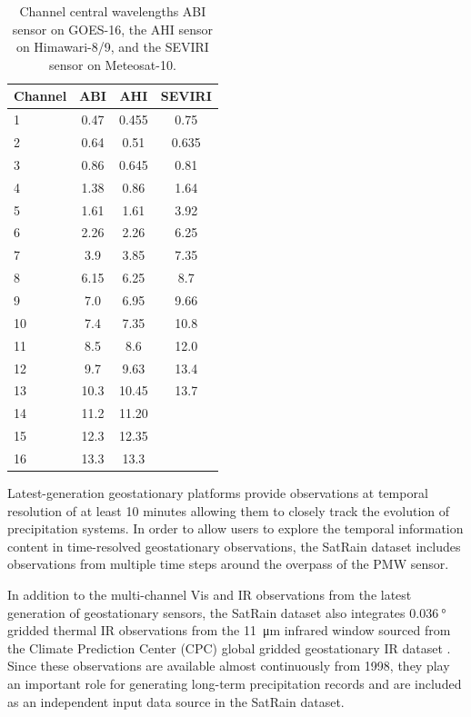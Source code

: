 \documentclass[11pt]{article}
\begin{document}
\begin{table}[htbp]
	\centering
	\begin{tabular}{lccc}
		\toprule
		Channel & ABI  & AHI   & SEVIRI \\
		\midrule
		1       & 0.47 & 0.455 & 0.75   \\
		2       & 0.64 & 0.51  & 0.635  \\
		3       & 0.86 & 0.645 & 0.81   \\
		4       & 1.38 & 0.86  & 1.64   \\
		5       & 1.61 & 1.61  & 3.92   \\
		6       & 2.26 & 2.26  & 6.25   \\
		7       & 3.9  & 3.85  & 7.35   \\
		8       & 6.15 & 6.25  & 8.7    \\
		9       & 7.0  & 6.95  & 9.66   \\
		10      & 7.4  & 7.35  & 10.8   \\
		11      & 8.5  & 8.6   & 12.0   \\
		12      & 9.7  & 9.63  & 13.4   \\
		13      & 10.3 & 10.45 & 13.7   \\
		14      & 11.2 & 11.20 &        \\
		15      & 12.3 & 12.35 &        \\
		16      & 13.3 & 13.3  &        \\
		\bottomrule
	\end{tabular}
	\caption{Channel central wavelengths ABI sensor on GOES-16, the AHI sensor on Himawari-8/9, and the SEVIRI sensor on Meteosat-10.}
	\label{tab:geo_channels}
\end{table}

Latest-generation geostationary platforms provide observations at temporal
resolution of at least 10 minutes allowing them to closely track the evolution of
precipitation systems. In order to allow users to explore the temporal
information content in time-resolved geostationary observations, the SatRain
dataset includes observations from multiple time steps around the overpass of
the PMW sensor.

In addition to the multi-channel Vis and IR observations from the latest
generation of geostationary sensors, the SatRain dataset also integrates
$\SI{0.036}{\degree}$ gridded thermal IR observations from the \SI{11}{\micro \meter}
infrared window sourced from the Climate Prediction Center (CPC) global gridded
geostationary IR dataset \citep{NCEP_CPC_L3_IR}. Since these observations are
available almost continuously from 1998, they play an important role for
generating long-term precipitation records and are included as an independent
input data source in the SatRain dataset.
\end{document}
